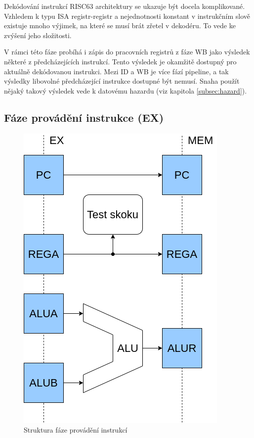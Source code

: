 \documentclass[
  digital, %
  color,   %
  table,   %
  twoside, %
  nolof,   %
  nolot,   %
]{fithesis3}
\begin{document}
Dekódování instrukcí RISC63 architektury se ukazuje být docela komplikované. Vzhledem k typu ISA registr-registr a nejednotnosti konstant v instrukčním slově existuje mnoho výjimek, na které se musí brát zřetel v dekodéru. To vede ke zvýšení jeho složitosti.

V rámci této fáze probíhá i zápis do pracovních registrů z fáze WB jako výsledek některé z předcházejících instrukcí. Tento výsledek je okamžitě dostupný pro aktuálně dekódovanou instrukci. Mezi ID a WB je více fází pipeline, a tak výsledky libovolné předcházející instrukce dostupné být nemusí. Snaha použít nějaký takový výsledek vede k datovému hazardu (viz kapitola \ref{subsec:hazard}).

\subsection{Fáze provádění instrukce (EX)}
\begin{figure}[H]
  \begin{center}
    \includegraphics[height=0.3\textheight]{img/risc63-ex}
  \end{center}
  \caption{Struktura fáze provádění instrukcí}
\end{figure}
\end{document}
